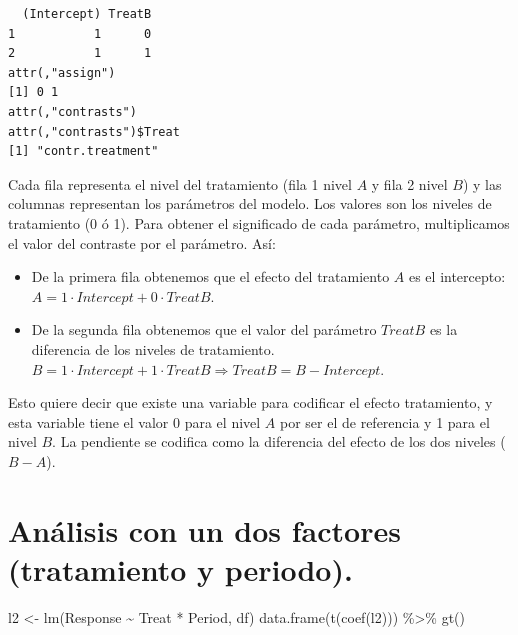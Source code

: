 \documentclass[
  12pt,
  a4paper,
  extrafontsizes,
  onecolumn,
  openright]{memoir}
\newenvironment{Shaded}{\begin{snugshade}}{\end{snugshade}}
\newcommand{\FunctionTok}[1]{\textcolor[rgb]{0.28,0.35,0.67}{#1}}
\newcommand{\NormalTok}[1]{\textcolor[rgb]{0.00,0.23,0.31}{#1}}
\newcommand{\OtherTok}[1]{\textcolor[rgb]{0.00,0.23,0.31}{#1}}
\newcommand{\SpecialCharTok}[1]{\textcolor[rgb]{0.37,0.37,0.37}{#1}}
\providecommand{\tightlist}{%
  \setlength{\itemsep}{0pt}\setlength{\parskip}{0pt}}\usepackage{longtable,booktabs,array}
\begin{document}
\begin{verbatim}
  (Intercept) TreatB
1           1      0
2           1      1
attr(,"assign")
[1] 0 1
attr(,"contrasts")
attr(,"contrasts")$Treat
[1] "contr.treatment"
\end{verbatim}

\normalsize

Cada fila representa el nivel del tratamiento (fila 1 nivel \(A\) y fila
2 nivel \(B\)) y las columnas representan los parámetros del modelo. Los
valores son los niveles de tratamiento (0 ó 1). Para obtener el
significado de cada parámetro, multiplicamos el valor del contraste por
el parámetro. Así:

\begin{itemize}
\tightlist
\item
  De la primera fila obtenemos que el efecto del tratamiento \(A\) es el
  intercepto: \(A = 1 \cdot Intercept + 0 \cdot TreatB\).
\item
  De la segunda fila obtenemos que el valor del parámetro \(TreatB\) es
  la diferencia de los niveles de tratamiento.
  \(B = 1 \cdot Intercept + 1 \cdot TreatB \Rightarrow TreatB = B - Intercept\).
\end{itemize}

Esto quiere decir que existe una variable para codificar el efecto
tratamiento, y esta variable tiene el valor 0 para el nivel \(A\) por
ser el de referencia y 1 para el nivel \(B\). La pendiente se codifica
como la diferencia del efecto de los dos niveles (\(B - A\)).

\hypertarget{anuxe1lisis-con-un-dos-factores-tratamiento-y-periodo.}{%
\section{Análisis con un dos factores (tratamiento y
periodo).}\label{anuxe1lisis-con-un-dos-factores-tratamiento-y-periodo.}}

\scriptsize

\begin{Shaded}
\begin{Highlighting}[]
\NormalTok{l2 }\OtherTok{\textless{}{-}} \FunctionTok{lm}\NormalTok{(Response }\SpecialCharTok{\textasciitilde{}}\NormalTok{ Treat }\SpecialCharTok{*}\NormalTok{ Period, df)}
\FunctionTok{data.frame}\NormalTok{(}\FunctionTok{t}\NormalTok{(}\FunctionTok{coef}\NormalTok{(l2))) }\SpecialCharTok{\%\textgreater{}\%} \FunctionTok{gt}\NormalTok{()}
\end{Highlighting}
\end{Shaded}
\end{document}
